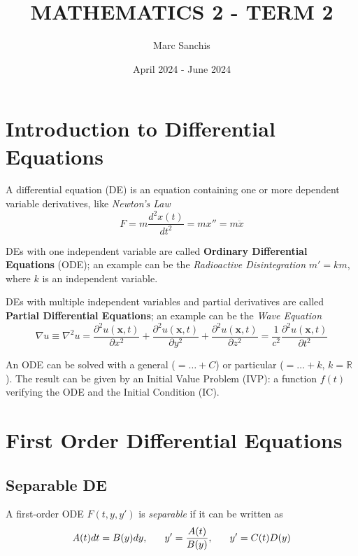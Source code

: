 \documentclass[a4paper]{article}
\title{MATHEMATICS 2 - TERM 2}
\author{Marc Sanchis}
\date{April 2024 - June 2024}
\begin{document}
\maketitle

\renewcommand{\contentsname}{}
\tableofcontents

\newpage
\restoregeometry
\pagestyle{fancy}
\setcounter{section}{5}

\section{Introduction to Differential Equations}

A differential equation (DE) is an equation containing one or more dependent variable derivatives, like \textit{Newton's Law}
$$
F=m \frac{d^{2}x(t)}{dt^{2}}=mx''=m\ddot{x}
$$

DEs with one independent variable are called \textbf{Ordinary Differential Equations} (ODE); an example can be the \textit{Radioactive Disintegration} $m'=km$, where $k$ is an independent variable.

DEs with multiple independent variables and partial derivatives are called \textbf{Partial Differential Equations}; an example can be the \textit{Wave Equation}
$$
\nabla u\equiv\nabla^{2}u=\frac{\partial^{2}u(\mathbf{x}, t)}{\partial x^{2}}+\frac{\partial^{2}u(\mathbf{x},t)}{\partial y^{2}}+\frac{\partial^{2}u(\mathbf{x},t)}{\partial z^{2}}=\frac{1}{c^{2}}\frac{\partial^{2}u(\mathbf{x},t)}{\partial t^{2}}
$$


An ODE can be solved with a general ($=\dots+C$) or particular ($=\dots+k,\,k=\mathbb{R}$). The result can be given by an Initial Value Problem (IVP): a function $f(t)$ verifying the ODE and the Initial Condition (IC).


\section{First Order Differential Equations}

\subsection{Separable DE}
A first-order ODE $F(t,y,y')$ is \textit{separable} if it can be written as
$$
A(t)dt=B(y)dy,\hspace{4ex}y'=\frac{A(t)}{B(y)},\hspace{4ex}y'=C(t)D(y)
$$
\end{document}
